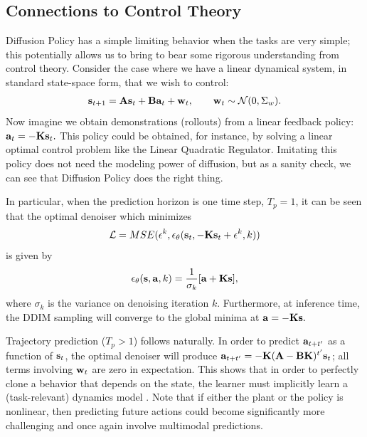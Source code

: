 \subsection{Connections to Control Theory}
\label{sec:control}
Diffusion Policy has a simple limiting behavior when the tasks are very simple; this potentially allows us to bring to bear some rigorous understanding from control theory. Consider the case where we have a linear dynamical system, in standard state-space form, that we wish to control:
\begin{gather*}
{\bf s}_{t+1} = {\bf A}{\bf s}_t + {\bf B}{\bf a}_t + {\bf w}_t, \qquad {\bf w}_t \sim \mathcal{N}(0, \Sigma_w).
\end{gather*} Now imagine we obtain demonstrations (rollouts) from a linear feedback policy: ${\bf a}_t = -{\bf K}{\bf s}_t.$ This policy could be obtained, for instance, by solving a linear optimal control problem like the Linear Quadratic Regulator. Imitating this policy does not need the modeling power of diffusion, but as a sanity check, we can see that Diffusion Policy does the right thing.

In particular, when the prediction horizon is one time step, $T_p=1$, it can be seen that the optimal denoiser which minimizes
\begin{equation}
    \mathcal{L}=MSE(\mathbf{\epsilon}^k,\epsilon_\theta(\mathbf{s}_t, -{\bf K}{\bf s}_t + \mathbf{\epsilon}^k, k))
\end{equation}
is given by $$\epsilon_\theta({\bf s}, {\bf a}, k) = \frac{1}{\sigma_k}[{\bf a} + {\bf K}{\bf s}],$$ where $\sigma_k$ is the variance on denoising iteration $k$. Furthermore, at inference time, the DDIM sampling will converge to the global minima at ${\bf a} = -{\bf Ks}.$

Trajectory prediction ($T_p>1$) follows naturally. In order to predict ${\bf a}_{t+t'}$ as a function of ${\bf s}_t$, the optimal denoiser will produce ${\bf a}_{t+t'} = -{\bf K}({\bf A}-{\bf BK})^{t'}{\bf s}_t$; all terms involving ${\bf w}_t$ are zero in expectation. This shows that in order to perfectly clone a behavior that depends on the state, the learner must implicitly learn a (task-relevant) dynamics model \cite{subramanian2019approximate,zhang2020learning}. Note that if either the plant or the policy is nonlinear, then predicting future actions could become significantly more challenging and once again involve multimodal predictions.

